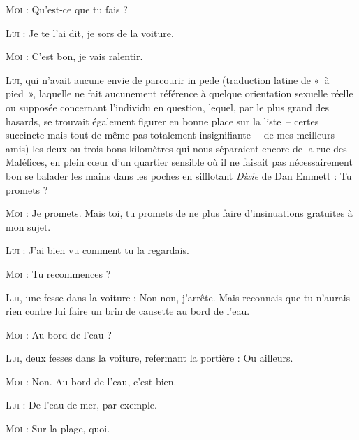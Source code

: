 \begin{dialogue}

\textsc{Moi} : Qu’est-ce que tu fais ?

\textsc{Lui} : Je te l’ai dit, je sors de la voiture.

\textsc{Moi} : C’est bon, je vais ralentir.

\textsc{Lui}, qui n’avait aucune envie de parcourir in pede (traduction latine de «~à pied~», laquelle ne fait aucunement référence à quelque orientation sexuelle réelle ou supposée concernant l’individu en question, lequel, par le plus grand des hasards, se trouvait également figurer en bonne place sur la liste~-- certes succincte mais tout de même pas totalement insignifiante~-- de mes meilleurs amis) les deux ou trois bons kilomètres qui nous séparaient encore de la rue des Maléfices, en plein cœur d’un quartier sensible où il ne faisait pas nécessairement bon se balader les mains dans les poches en sifflotant \textit{Dixie} de Dan Emmett : Tu promets ?


\textsc{Moi} : Je promets. Mais toi, tu promets de ne plus faire d’insinuations gratuites à mon sujet.

\textsc{Lui} : J’ai bien vu comment tu la regardais.

\textsc{Moi} : Tu recommences ?

\textsc{Lui}, une fesse dans la voiture : Non non, j’arrête. Mais reconnais que tu n’aurais rien contre lui faire un brin de causette au bord de l’eau.

\textsc{Moi} : Au bord de l’eau ?

\textsc{Lui}, deux fesses dans la voiture, refermant la portière : Ou ailleurs.

\textsc{Moi} : Non. Au bord de l’eau, c’est bien.

\textsc{Lui} : De l’eau de mer, par exemple.

\textsc{Moi} : Sur la plage, quoi.


\end{dialogue}
